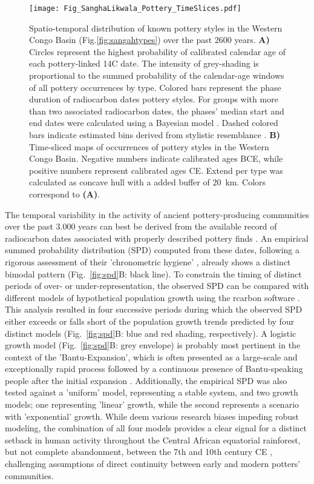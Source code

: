 \documentclass[smallextended,natbib]{svjour3}       %
\begin{document}
\begin{figure}[p]
	\centering
	\texttt{[image: Fig\_SanghaLikwala\_Pottery\_TimeSlices.pdf]}
	\caption{Spatio-temporal distribution of known pottery styles in the Western Congo Basin (Fig.\ref{fig:sangahtypes}) over the past 2600 years. \textbf{A)} Circles represent the highest probability of calibrated calendar age of each pottery-linked 14C date. The intensity of grey-shading is proportional to the summed probability of the calendar-age windows of all pottery occurrences by type. Colored bars represent the phase duration of radiocarbon dates pottery styles. For groups with more than two associated radiocarbon dates, the phases' median start and end dates were calculated using a Bayesian model \citep[Fig.~S1,Tab.~S1]{Crema.2021a,Crema.2021b,Seidensticker.2024}. Dashed colored bars indicate estimated bins derived from stylistic resemblance \citep[Data S2]{Seidensticker.2021}. \textbf{B)} Time-sliced maps of occurrences of pottery styles in the Western Congo Basin. Negative numbers indicate calibrated ages BCE, while positive numbers represent calibrated ages CE. Extend per type was calculated as concave hull \citep{Gombin.2017} with a added buffer of 20~km. Colors correspond to \textbf{(A)}.}
	\label{fig:timeslicemaps}
\end{figure}

The temporal variability in the activity of ancient pottery-producing communities over the past 3.000 years can best be derived from the available record of radiocarbon dates associated with properly described pottery finds \citep{Seidensticker.2021f}. An empirical summed probability distribution (SPD) computed from these dates, following a rigorous assessment of their 'chronometric hygiene' \citep{Napolitano.2019}, already shows a distinct bimodal pattern (Fig.~\ref{fig:spd}B: black line). To constrain the timing of distinct periods of over- or under-representation, the observed SPD can be compared with different models of hypothetical population growth using the rcarbon software \citep{Bevan.2022}. This analysis resulted in four successive periods during which the observed SPD either exceeds or falls short of the population growth trends predicted by four distinct models (Fig.~\ref{fig:spd}B: blue and red shading, respectively). A logistic growth model (Fig.~\ref{fig:spd}B: grey envelope) is probably most pertinent in the context of the 'Bantu-Expansion', which is often presented as a large-scale and exceptionally rapid process followed by a continuous presence of Bantu-speaking people after the initial expansion \citep{Pakendorf.2011,Grollemund.2015,Bostoen.2015,Bostoen.2022,Koile.2022}. Additionally, the empirical SPD was also tested against a 'uniform' model, representing a stable system, and two growth models; one representing 'linear' growth, while the second represents a scenario with 'exponential' growth. While \citet{Clist.2023a} deem various research biases impeding robust modeling, the combination of all four models provides a clear signal for a distinct setback in human activity throughout the Central African equatorial rainforest, but not complete abandonment, between the 7th and 10th century CE \citep{Seidensticker.2021f}, challenging assumptions of direct continuity between early and modern potters' communities. 
\end{document}
